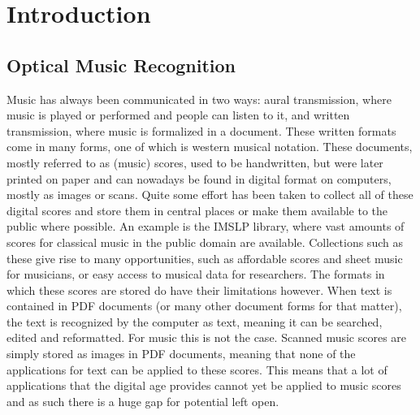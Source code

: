 \chapter{Introduction}

\section{Optical Music Recognition}
Music has always been communicated in two ways: aural transmission, where music is played or performed and people can listen to it, and written transmission, where music is formalized in a document. These written formats come in many forms, one of which is western musical notation. These documents, mostly referred to as (music) scores, used to be handwritten, but were later printed on paper and can nowadays be found in digital format on computers, mostly as images or scans. Quite some effort has been taken to collect all of these digital scores and store them in central places or make them available to the public where possible. An example is the IMSLP library, where vast amounts of scores for classical music in the public domain are available. Collections such as these give rise to many opportunities, such as affordable scores and sheet music for musicians, or easy access to musical data for researchers. The formats in which these scores are stored do have their limitations however. When text is contained in PDF documents (or many other document forms for that matter), the text is recognized by the computer as text, meaning it can be searched, edited and reformatted. For music this is not the case. Scanned music scores are simply stored as images in PDF documents, meaning that none of the applications for text can be applied to these scores. This means that a lot of applications that the digital age provides cannot yet be applied to music scores and as such there is a huge gap for potential left open.

